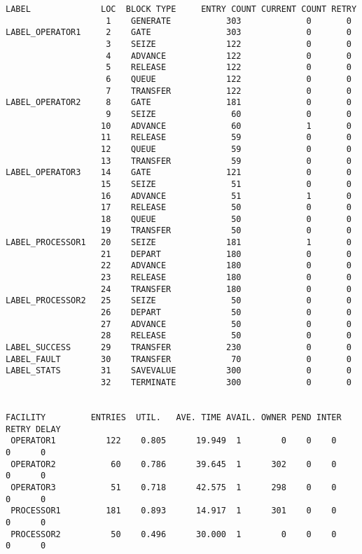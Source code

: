 \begin{lstlisting}[caption={Отчет о работе системы}]
 LABEL              LOC  BLOCK TYPE     ENTRY COUNT CURRENT COUNT RETRY
                    1    GENERATE           303             0       0
LABEL_OPERATOR1     2    GATE               303             0       0
                    3    SEIZE              122             0       0
                    4    ADVANCE            122             0       0
                    5    RELEASE            122             0       0
                    6    QUEUE              122             0       0
                    7    TRANSFER           122             0       0
LABEL_OPERATOR2     8    GATE               181             0       0
                    9    SEIZE               60             0       0
                   10    ADVANCE             60             1       0
                   11    RELEASE             59             0       0
                   12    QUEUE               59             0       0
                   13    TRANSFER            59             0       0
LABEL_OPERATOR3    14    GATE               121             0       0
                   15    SEIZE               51             0       0
                   16    ADVANCE             51             1       0
                   17    RELEASE             50             0       0
                   18    QUEUE               50             0       0
                   19    TRANSFER            50             0       0
LABEL_PROCESSOR1   20    SEIZE              181             1       0
                   21    DEPART             180             0       0
                   22    ADVANCE            180             0       0
                   23    RELEASE            180             0       0
                   24    TRANSFER           180             0       0
LABEL_PROCESSOR2   25    SEIZE               50             0       0
                   26    DEPART              50             0       0
                   27    ADVANCE             50             0       0
                   28    RELEASE             50             0       0
LABEL_SUCCESS      29    TRANSFER           230             0       0
LABEL_FAULT        30    TRANSFER            70             0       0
LABEL_STATS        31    SAVEVALUE          300             0       0
                   32    TERMINATE          300             0       0


FACILITY         ENTRIES  UTIL.   AVE. TIME AVAIL. OWNER PEND INTER RETRY DELAY
 OPERATOR1          122    0.805      19.949  1        0    0    0     0      0
 OPERATOR2           60    0.786      39.645  1      302    0    0     0      0
 OPERATOR3           51    0.718      42.575  1      298    0    0     0      0
 PROCESSOR1         181    0.893      14.917  1      301    0    0     0      0
 PROCESSOR2          50    0.496      30.000  1        0    0    0     0      0



\end{lstlisting}
